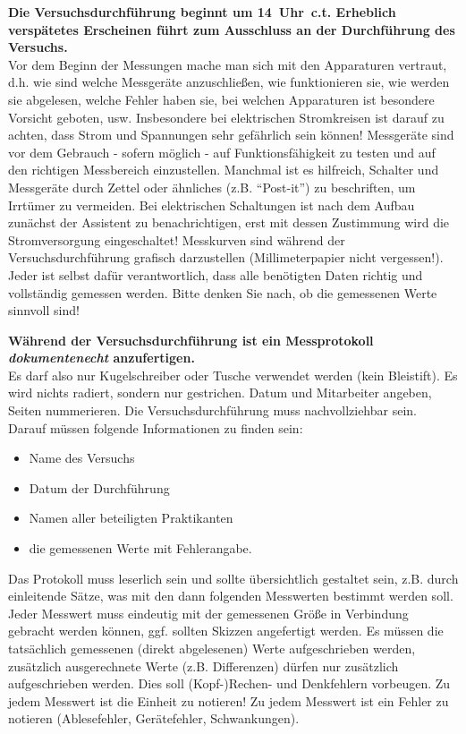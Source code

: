 \textbf{Die Versuchsdurchführung beginnt um 14~Uhr~c.t. Erheblich verspätetes Erscheinen führt zum Ausschluss an der Durchführung des Versuchs.}\\
Vor dem Beginn der Messungen mache man sich mit den Apparaturen vertraut, d.h. wie sind welche Messgeräte anzuschließen, wie funktionieren sie, wie werden sie abgelesen, welche Fehler haben sie, bei welchen Apparaturen ist besondere Vorsicht geboten, usw. Insbesondere bei elektrischen Stromkreisen ist darauf zu achten, dass Strom und
Spannungen sehr gefährlich sein können! Messgeräte sind vor dem Gebrauch - sofern möglich - auf Funktionsfähigkeit zu testen und auf den richtigen Messbereich einzustellen. Manchmal ist es hilfreich, Schalter und Messgeräte durch Zettel oder ähnliches (z.B. "`Post-it"') zu beschriften, um Irrtümer zu vermeiden. Bei elektrischen Schaltungen ist nach dem Aufbau zunächst der Assistent zu benachrichtigen, erst mit dessen Zustimmung wird die Stromversorgung eingeschaltet! Messkurven sind während der Versuchsdurchführung grafisch darzustellen (Millimeterpapier nicht vergessen!). Jeder ist selbst dafür verantwortlich, dass alle benötigten Daten richtig und vollständig gemessen werden. Bitte denken Sie nach, ob die gemessenen Werte sinnvoll sind!

\textbf{Während der Versuchsdurchführung ist ein Messprotokoll \emph{dokumentenecht} anzufertigen.} \\
Es darf also nur Kugelschreiber oder Tusche verwendet werden (kein Bleistift). Es wird nichts radiert, sondern nur gestrichen. Datum und Mitarbeiter angeben, Seiten nummerieren. Die Versuchsdurchführung muss nachvollziehbar sein. \\
Darauf müssen folgende Informationen zu finden sein:
\begin{itemize}
	\item Name des Versuchs
	\item Datum der Durchführung 
	\item Namen aller beteiligten Praktikanten 
	\item die gemessenen Werte mit Fehlerangabe.
\end{itemize} 
Das Protokoll muss leserlich sein und sollte übersichtlich gestaltet sein, z.B. durch einleitende Sätze, was mit den dann folgenden Messwerten bestimmt werden soll. Jeder Messwert muss eindeutig mit der gemessenen Größe in Verbindung gebracht werden können, ggf. sollten Skizzen angefertigt werden. Es müssen die tatsächlich gemessenen (direkt abgelesenen) Werte aufgeschrieben werden, zusätzlich ausgerechnete Werte (z.B. Differenzen) dürfen nur zusätzlich aufgeschrieben werden. Dies soll (Kopf-)Rechen- und Denkfehlern
vorbeugen. Zu jedem Messwert ist die Einheit zu notieren! Zu jedem Messwert ist ein Fehler zu notieren (Ablesefehler, Gerätefehler, Schwankungen).

